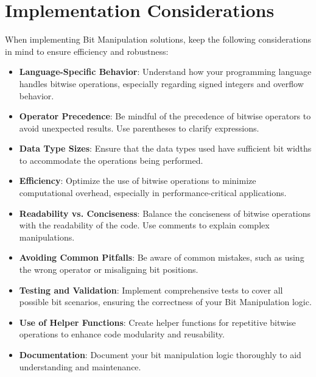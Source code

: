 \section*{Implementation Considerations}

When implementing Bit Manipulation solutions, keep the following considerations in mind to ensure efficiency and robustness:

\begin{itemize}
    \item \textbf{Language-Specific Behavior}: Understand how your programming language handles bitwise operations, especially regarding signed integers and overflow behavior.
    
    \item \textbf{Operator Precedence}: Be mindful of the precedence of bitwise operators to avoid unexpected results. Use parentheses to clarify expressions.
    
    \item \textbf{Data Type Sizes}: Ensure that the data types used have sufficient bit widths to accommodate the operations being performed.
    
    \item \textbf{Efficiency}: Optimize the use of bitwise operations to minimize computational overhead, especially in performance-critical applications.
    
    \item \textbf{Readability vs. Conciseness}: Balance the conciseness of bitwise operations with the readability of the code. Use comments to explain complex manipulations.
    
    \item \textbf{Avoiding Common Pitfalls}: Be aware of common mistakes, such as using the wrong operator or misaligning bit positions.
    
    \item \textbf{Testing and Validation}: Implement comprehensive tests to cover all possible bit scenarios, ensuring the correctness of your Bit Manipulation logic.
    
    \item \textbf{Use of Helper Functions}: Create helper functions for repetitive bitwise operations to enhance code modularity and reusability.
    
    \item \textbf{Documentation}: Document your bit manipulation logic thoroughly to aid understanding and maintenance.
\end{itemize}


